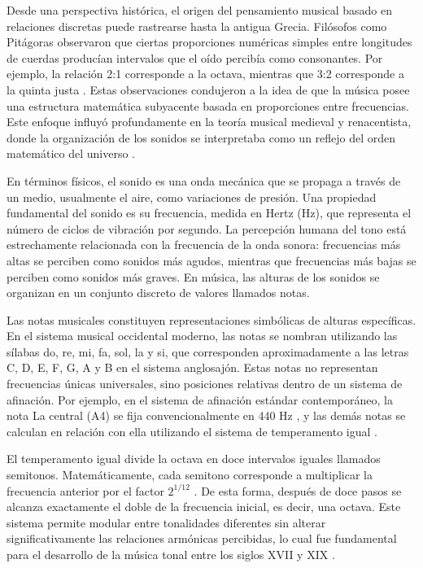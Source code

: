 \documentclass[12pt]{report}
\begin{document}
Desde una perspectiva histórica, el origen del pensamiento musical basado en relaciones discretas puede rastrearse hasta la antigua Grecia. Filósofos como Pitágoras observaron que ciertas proporciones numéricas simples entre longitudes de cuerdas producían intervalos que el oído percibía como consonantes. Por ejemplo, la relación 2:1 corresponde a la octava, mientras que 3:2 corresponde a la quinta justa \cite{baker2007}. Estas observaciones condujeron a la idea de que la música posee una estructura matemática subyacente basada en proporciones entre frecuencias. Este enfoque influyó profundamente en la teoría musical medieval y renacentista, donde la organización de los sonidos se interpretaba como un reflejo del orden matemático del universo \cite{christensen2002}. 

En términos físicos, el sonido es una onda mecánica que se propaga a través de un medio, usualmente el aire, como variaciones de presión. Una propiedad fundamental del sonido es su frecuencia, medida en Hertz (Hz), que representa el número de ciclos de vibración por segundo. La percepción humana del tono está estrechamente relacionada con la frecuencia de la onda sonora: frecuencias más altas se perciben como sonidos más agudos, mientras que frecuencias más bajas se perciben como sonidos más graves. En música, las alturas de los sonidos se organizan en un conjunto discreto de valores llamados notas\cite{zwicker2013}.

Las notas musicales constituyen representaciones simbólicas de alturas específicas. En el sistema musical occidental moderno, las notas se nombran utilizando las sílabas do, re, mi, fa, sol, la y si, que corresponden aproximadamente a las letras C, D, E, F, G, A y B en el sistema anglosajón. Estas notas no representan frecuencias únicas universales, sino posiciones relativas dentro de un sistema de afinación. Por ejemplo, en el sistema de afinación estándar contemporáneo, la nota La central (A4) se fija convencionalmente en 440 Hz , y las demás notas se calculan en relación con ella utilizando el sistema de temperamento igual \cite{iso16:1975}.

El temperamento igual divide la octava en doce intervalos iguales llamados semitonos. Matemáticamente, cada semitono corresponde a multiplicar la frecuencia anterior por el factor $2^{1/12}$ \cite{benson2006}. De esta forma, después de doce pasos se alcanza exactamente el doble de la frecuencia inicial, es decir, una octava. Este sistema permite modular entre tonalidades diferentes sin alterar significativamente las relaciones armónicas percibidas, lo cual fue fundamental para el desarrollo de la música tonal entre los siglos XVII y XIX \cite{isacoff2001temperament}.
\end{document}
